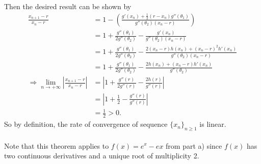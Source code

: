 \documentclass[11pt, letterpaper]{article}
\begin{document}
Then the desired result can be shown by
\begin{align*}
    \frac{x_{n+1}-r}{x_n-r}&=1-\left(\frac{g'(x_n)+\frac{1}{2}(r-x_n)g''(\theta_1)}{g''(\theta_2)(x_n-r)}\right)\\
    &=1+\frac{g''(\theta_1)}{2g''(\theta_2)}-\frac{g'(x_n)}{g''(\theta_2)(x_n-r)}\\
    &=1+\frac{g''(\theta_1)}{2g''(\theta_2)}-\frac{2(x_n-r)h(x_n)+(x_n-r)^2h'(x_n)}{g''(\theta_2)(x_n-r)}\\
    &=1+\frac{g''(\theta_1)}{2g''(\theta_2)}-\frac{2h(x_n)+(x_n-r)h'(x_n)}{g''(\theta_2)}\\
    \Rightarrow \lim_{n\to+\infty}\left|\frac{x_{n+1}-r}{x_n-r}\right|&=\left|1+\frac{g''(r)}{2g''(r)}-\frac{2h(r)}{g''(r)}\right|\\
    &=\left|1+\frac{1}{2}-\frac{g''(r)}{g''(r)}\right|\\
    &=\frac{1}{2}>0.
\end{align*}
So by definition, the rate of convergence of sequence $\{x_n\}_{n\geq 1}$ is linear.\\\\
Note that this theorem applies to $f(x)=e^x-ex$ from part a) since $f(x)$ has two continuous derivatives and a unique root of multiplicity 2.
\end{document}
